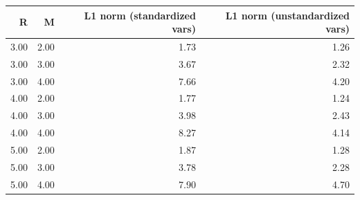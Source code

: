 \begin{table}[ht]
\centering
\begin{tabular}{rrrr}
  \hline
R & M & L1 norm (standardized vars) & L1 norm (unstandardized vars) \\ 
  \hline
3.00 & 2.00 & 1.73 & 1.26 \\ 
  3.00 & 3.00 & 3.67 & 2.32 \\ 
  3.00 & 4.00 & 7.66 & 4.20 \\ 
  4.00 & 2.00 & 1.77 & 1.24 \\ 
  4.00 & 3.00 & 3.98 & 2.43 \\ 
  4.00 & 4.00 & 8.27 & 4.14 \\ 
  5.00 & 2.00 & 1.87 & 1.28 \\ 
  5.00 & 3.00 & 3.78 & 2.28 \\ 
  5.00 & 4.00 & 7.90 & 4.70 \\ 
   \hline
\end{tabular}
\end{table}
